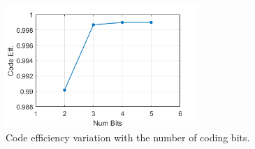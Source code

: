 \begin{refsection}
\begin{figure}[h]
	\centering
	\includegraphics[width=0.65\textwidth]{./sdf/eit_46084_arithmetic_encoder_decoder/figures/CodeEff.png}
	\caption{Code efficiency variation with the number of coding bits.} \label{fig:CodeEff}
\end{figure}


\newpage

\clearpage
\end{refsection}
\cleardoublepage

